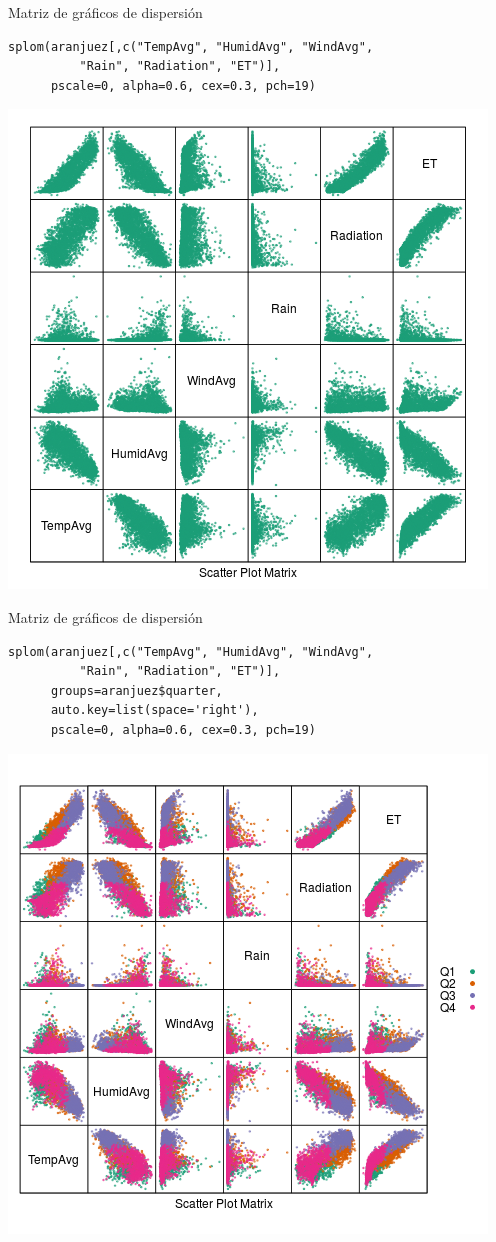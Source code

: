 \documentclass[xcolor={usenames,svgnames,dvipsnames}]{beamer}
\begin{document}
\begin{frame}[fragile,label=sec-2-1-16]{Matriz de gráficos de dispersión}
 \lstset{language=R,numbers=none}
\begin{lstlisting}
splom(aranjuez[,c("TempAvg", "HumidAvg", "WindAvg",
		  "Rain", "Radiation", "ET")],
      pscale=0, alpha=0.6, cex=0.3, pch=19)
\end{lstlisting}

\includegraphics[width=.9\linewidth]{figs/splom.png}
\end{frame}
\begin{frame}[fragile,label=sec-2-1-17]{Matriz de gráficos de dispersión}
 \lstset{language=R,numbers=none}
\begin{lstlisting}
splom(aranjuez[,c("TempAvg", "HumidAvg", "WindAvg",
		  "Rain", "Radiation", "ET")],
      groups=aranjuez$quarter,
      auto.key=list(space='right'),
      pscale=0, alpha=0.6, cex=0.3, pch=19)
\end{lstlisting}

\includegraphics[width=.9\linewidth]{figs/splomGroup.png}
\end{frame}
\end{document}
